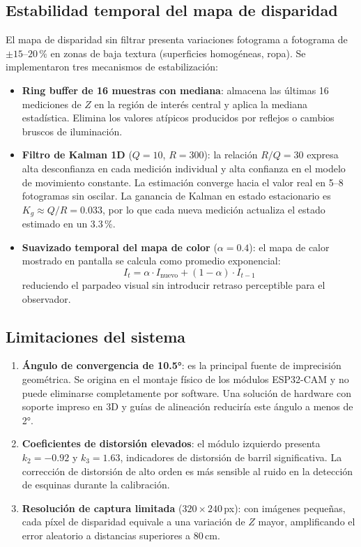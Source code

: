 \subsection{Estabilidad temporal del mapa de disparidad}

El mapa de disparidad sin filtrar presenta variaciones fotograma a fotograma de $\pm 15$–$20\,\%$ en zonas de baja textura (superficies homogéneas, ropa). Se implementaron tres mecanismos de estabilización:

\begin{itemize}
    \item \textbf{Ring buffer de 16 muestras con mediana}: almacena las últimas 16 mediciones de $Z$ en la región de interés central y aplica la mediana estadística. Elimina los valores atípicos producidos por reflejos o cambios bruscos de iluminación.

    \item \textbf{Filtro de Kalman 1D} ($Q=10$, $R=300$): la relación $R/Q = 30$ expresa alta desconfianza en cada medición individual y alta confianza en el modelo de movimiento constante. La estimación converge hacia el valor real en 5–8 fotogramas sin oscilar. La ganancia de Kalman en estado estacionario es $K_g \approx Q/R = 0.033$, por lo que cada nueva medición actualiza el estado estimado en un 3.3\,\%.

    \item \textbf{Suavizado temporal del mapa de color} ($\alpha = 0.4$): el mapa de calor mostrado en pantalla se calcula como promedio exponencial:
    \[
    I_t = \alpha \cdot I_{\text{nuevo}} + (1 - \alpha) \cdot I_{t-1}
    \]
    reduciendo el parpadeo visual sin introducir retraso perceptible para el observador.
\end{itemize}

\subsection{Limitaciones del sistema}

\begin{enumerate}
    \item \textbf{Ángulo de convergencia de 10.5°}: es la principal fuente de imprecisión geométrica. Se origina en el montaje físico de los módulos ESP32-CAM y no puede eliminarse completamente por software. Una solución de hardware con soporte impreso en 3D y guías de alineación reduciría este ángulo a menos de 2°.

    \item \textbf{Coeficientes de distorsión elevados}: el módulo izquierdo presenta $k_2 = -0.92$ y $k_3 = 1.63$, indicadores de distorsión de barril significativa. La corrección de distorsión de alto orden es más sensible al ruido en la detección de esquinas durante la calibración.

    \item \textbf{Resolución de captura limitada} ($320 \times 240$\,px): con imágenes pequeñas, cada píxel de disparidad equivale a una variación de $Z$ mayor, amplificando el error aleatorio a distancias superiores a 80\,cm.
\end{enumerate}
